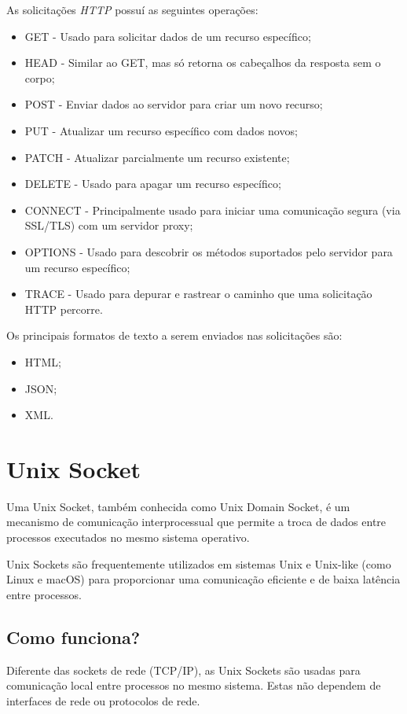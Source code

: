 As solicitações \textit{HTTP} possuí as seguintes operações:
\begin{itemize}
    \item GET - Usado para solicitar dados de um recurso específico;
    \item HEAD - Similar ao GET, mas só retorna os cabeçalhos da resposta sem o corpo;
    \item POST - Enviar dados ao servidor para criar um novo recurso; 
    \item PUT - Atualizar um recurso específico com dados novos;
    \item PATCH - Atualizar parcialmente um recurso existente; 
    \item DELETE - Usado para apagar um recurso específico; 
    \item CONNECT - Principalmente usado para iniciar uma comunicação
    segura (via SSL/TLS) com um servidor proxy; 
    \item OPTIONS - Usado para descobrir os métodos suportados pelo servidor para um recurso específico;
    \item TRACE - Usado para depurar e rastrear o caminho que uma solicitação HTTP percorre.
\end{itemize}


Os principais formatos de texto a serem enviados nas solicitações são:
\begin{itemize}
    \item HTML;
    \item JSON;
    \item XML.
\end{itemize}


\section{Unix Socket}

Uma Unix Socket, também conhecida como Unix Domain Socket, 
é um mecanismo de comunicação interprocessual  que permite a troca de dados 
entre processos executados no mesmo sistema operativo.

Unix Sockets são frequentemente utilizados em sistemas Unix e Unix-like
(como Linux e macOS) para proporcionar uma comunicação eficiente e de baixa 
latência entre processos.


\subsection{Como funciona?}

Diferente das sockets de rede (TCP/IP), as Unix Sockets são usadas para 
comunicação local entre processos no mesmo sistema. Estas não dependem de interfaces 
de rede ou protocolos de rede.

